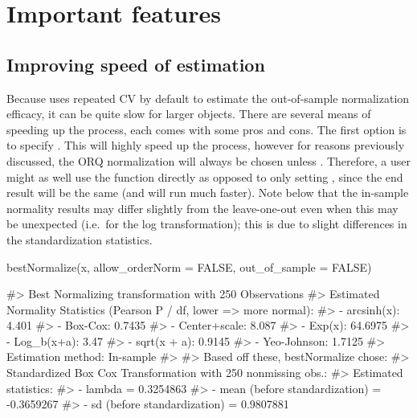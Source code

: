 \hypertarget{important-features}{%
\section{Important features}\label{important-features}}

\hypertarget{improving-speed-of-estimation}{%
\subsection{Improving speed of
estimation}\label{improving-speed-of-estimation}}

Because  uses repeated CV by default to estimate the
out-of-sample normalization efficacy, it can be quite slow for larger
objects. There are several means of speeding up the process, each comes
with some pros and cons. The first option is to specify
. This will
highly speed up the process, however for reasons previously discussed,
the ORQ normalization will always be chosen unless
. Therefore, a user might
as well use the  function directly as opposed to only
setting ,
since the end result will be the same (and  will run
much faster). Note below that the in-sample normality results may differ
slightly from the leave-one-out even when this may be unexpected
(i.e.~for the log transformation); this is due to slight differences in
the standardization statistics.

\begin{Schunk}
\begin{Sinput}
bestNormalize(x, allow_orderNorm = FALSE, out_of_sample = FALSE)
\end{Sinput}
\begin{Soutput}
#> Best Normalizing transformation with 250 Observations
#>  Estimated Normality Statistics (Pearson P / df, lower => more normal):
#>  - arcsinh(x): 4.401
#>  - Box-Cox: 0.7435
#>  - Center+scale: 8.087
#>  - Exp(x): 64.6975
#>  - Log_b(x+a): 3.47
#>  - sqrt(x + a): 0.9145
#>  - Yeo-Johnson: 1.7125
#> Estimation method: In-sample
#>  
#> Based off these, bestNormalize chose:
#> Standardized Box Cox Transformation with 250 nonmissing obs.:
#>  Estimated statistics:
#>  - lambda = 0.3254863 
#>  - mean (before standardization) = -0.3659267 
#>  - sd (before standardization) = 0.9807881
\end{Soutput}
\end{Schunk}

